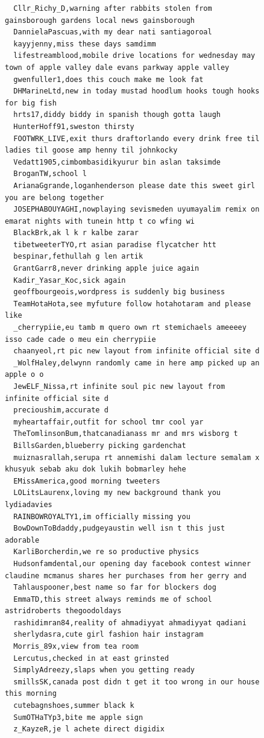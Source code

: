 \begin{figure}[htpb]
\begin{verbatim}
  Cllr_Richy_D,warning after rabbits stolen from gainsborough gardens local news gainsborough
  DannielaPascuas,with my dear nati santiagoroal
  kayyjenny,miss these days samdimm
  lifestreamblood,mobile drive locations for wednesday may town of apple valley dale evans parkway apple valley
  gwenfuller1,does this couch make me look fat
  DHMarineLtd,new in today mustad hoodlum hooks tough hooks for big fish
  hrts17,diddy biddy in spanish though gotta laugh
  HunterHoff91,sweston thirsty
  FOOTWRK_LIVE,exit thurs draftorlando every drink free til ladies til goose amp henny til johnkocky
  Vedatt1905,cimbombasidikyurur bin aslan taksimde
  BroganTW,school l
  ArianaGgrande,loganhenderson please date this sweet girl you are belong together
  JOSEPHABOUYAGHI,nowplaying sevismeden uyumayalim remix on emarat nights with tunein http t co wfing wi
  BlackBrk,ak l k r kalbe zarar
  tibetweeterTYO,rt asian paradise flycatcher htt
  bespinar,fethullah g len artik
  GrantGarr8,never drinking apple juice again
  Kadir_Yasar_Koc,sick again
  geoffbourgeois,wordpress is suddenly big business
  TeamHotaHota,see myfuture follow hotahotaram and please like
  _cherrypiie,eu tamb m quero own rt stemichaels ameeeey isso cade cade o meu ein cherrypiie
  chaanyeol,rt pic new layout from infinite official site d
  _WolfHaley,delwynn randomly came in here amp picked up an apple o o
  JewELF_Nissa,rt infinite soul pic new layout from infinite official site d
  precioushim,accurate d
  myheartaffair,outfit for school tmr cool yar
  TheTomlinsonBum,thatcanadianass mr and mrs wisborg t
  BillsGarden,blueberry picking gardenchat
  muiznasrallah,serupa rt annemishi dalam lecture semalam x khusyuk sebab aku dok lukih bobmarley hehe
  EMissAmerica,good morning tweeters
  LOLitsLaurenx,loving my new background thank you lydiadavies
  RAINBOWROYALTY1,im officially missing you
  BowDownToBdaddy,pudgeyaustin well isn t this just adorable
  KarliBorcherdin,we re so productive physics
  Hudsonfamdental,our opening day facebook contest winner claudine mcmanus shares her purchases from her gerry and
  Tahlauspooner,best name so far for blockers dog
  EmmaTD,this street always reminds me of school astridroberts thegoodoldays
  rashidimran84,reality of ahmadiyyat ahmadiyyat qadiani
  sherlydasra,cute girl fashion hair instagram
  Morris_89x,view from tea room
  Lercutus,checked in at east grinsted
  SimplyAdreezy,slaps when you getting ready
  smillsSK,canada post didn t get it too wrong in our house this morning
  cutebagnshoes,summer black k
  SumOTHaTYp3,bite me apple sign
  z_KayzeR,je l achete direct digidix

\end{verbatim}
\end{figure}
